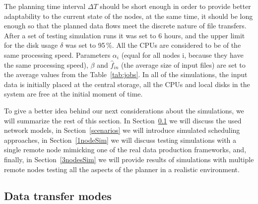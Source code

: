 \documentclass{svjour3}                     %
\begin{document}
The planning time interval $\Delta T$ should be short enough in order to provide better adaptability to the current state of the nodes, at the same time, it should be long enough so that the planned data flows meet the discrete nature of file transfers. After a set of testing simulation runs it was set to 6 hours, and the upper limit for the disk usage $\delta$ was set to 95\,\%. All the CPUs are considered to be of the same processing speed. Parameters $\alpha_{i}$ (equal for all nodes i, because they have the same processing speed), $\beta$ and $\widehat{f}_{in}$ (the average size of input files) are set to the average values from the Table~\ref{tab:jobs}. In all of the simulations, the input data is initially placed at the central storage, all the CPUs and local disks in the system are free at the initial moment of time.

To give a better idea behind our next considerations about the simulations, we will
summarize the rest of this section. In Section~\ref{network} we will discuss the used network models, in Section~\ref{scenarios} we will introduce simulated scheduling approaches, in Section~\ref{1nodeSim} we will discuss testing simulations with a single remote node mimicking one of the real data production frameworks, and, finally, in Section~\ref{3nodesSim} we will provide results of simulations with multiple remote nodes testing all the aspects of the planner in a realistic environment.


\subsection{Data transfer modes}
\label{network}
\end{document}
